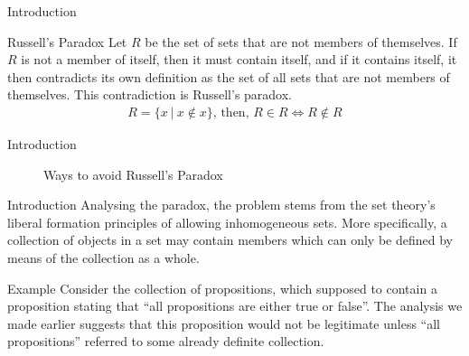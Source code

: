 \documentclass[10pt]{beamer}
\begin{document}
\begin{frame}{Introduction}
\begin{alertblock}{Russell's Paradox}
Let $R$ be the set of sets that are not members of themselves. If $R$ is not a member of itself, then it must contain itself, and if it contains itself, it then contradicts its own definition as the set of all sets that are not members of themselves. This contradiction is Russell's paradox.
\begin{align*}
R = \{x ~|~ x \notin x\}  \text{, then, } R \in R \Leftrightarrow R \notin R
\end{align*}
\end{alertblock}
\end{frame}


\begin{frame}{Introduction}
\begin{figure}[h]
\centering
{}
\caption{Ways to avoid Russell's Paradox}
\end{figure}
\end{frame}

\begin{frame}{Introduction}
Analysing the paradox, the problem stems from the set theory's liberal formation principles of allowing inhomogeneous sets. More specifically, a collection of objects in a set may contain members which can only be defined by means of the collection as a whole.

\begin{exampleblock}{Example}
Consider the collection of propositions, which supposed to contain a proposition stating that ``all propositions are either true or false''. The analysis we made earlier suggests that this proposition would not be legitimate unless ``all propositions'' referred to some already definite collection.
\end{exampleblock}


\end{frame}
\end{document}
